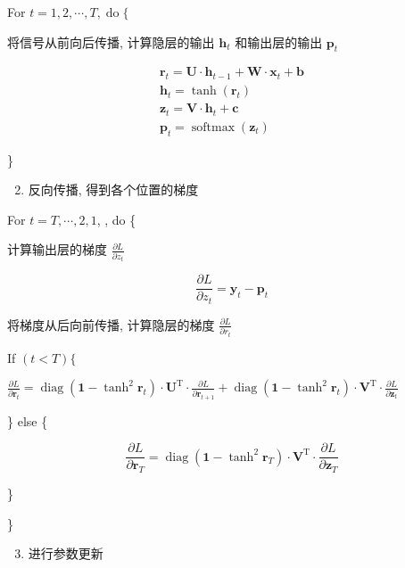 \documentclass[10pt]{article}
\begin{document}
For $t=1,2, \cdots, T, \operatorname{do}\{$

将信号从前向后传播, 计算隐层的输出 $\boldsymbol{h}_{t}$ 和输出层的输出 $\boldsymbol{p}_{t}$

$$
\begin{gathered}
\boldsymbol{r}_{t}=\boldsymbol{U} \cdot \boldsymbol{h}_{t-1}+\boldsymbol{W} \cdot \boldsymbol{x}_{t}+\boldsymbol{b} \\
\boldsymbol{h}_{t}=\tanh \left(\boldsymbol{r}_{t}\right) \\
\boldsymbol{z}_{t}=\boldsymbol{V} \cdot \boldsymbol{h}_{t}+\boldsymbol{c} \\
\boldsymbol{p}_{t}=\operatorname{softmax}\left(\boldsymbol{z}_{t}\right)
\end{gathered}
$$

\}

\begin{enumerate}
  \setcounter{enumi}{1}
  \item 反向传播, 得到各个位置的梯度
\end{enumerate}

For $t=T, \cdots, 2,1$, , do \{

计算输出层的梯度 $\frac{\partial L}{\partial z_{t}}$

$$
\frac{\partial L}{\partial z_{t}}=\boldsymbol{y}_{t}-\boldsymbol{p}_{t}
$$

将梯度从后向前传播, 计算隐层的梯度 $\frac{\partial L}{\partial r_{t}}$

If $(t<T)\{$

$\frac{\partial L}{\partial \boldsymbol{r}_{t}}=\operatorname{diag}\left(\boldsymbol{1}-\tanh ^{2} \boldsymbol{r}_{t}\right) \cdot \boldsymbol{U}^{\mathrm{T}} \cdot \frac{\partial L}{\partial \boldsymbol{r}_{t+1}}+\operatorname{diag}\left(\boldsymbol{1}-\tanh ^{2} \boldsymbol{r}_{t}\right) \cdot \boldsymbol{V}^{\mathrm{T}} \cdot \frac{\partial L}{\partial \boldsymbol{z}_{t}}$

\} else \{

$$
\frac{\partial L}{\partial \boldsymbol{r}_{T}}=\operatorname{diag}\left(\boldsymbol{1}-\tanh ^{2} \boldsymbol{r}_{T}\right) \cdot \boldsymbol{V}^{\mathrm{T}} \cdot \frac{\partial L}{\partial \boldsymbol{z}_{T}}
$$

\}

\}

\begin{enumerate}
  \setcounter{enumi}{2}
  \item 进行参数更新
\end{enumerate}
\end{document}
